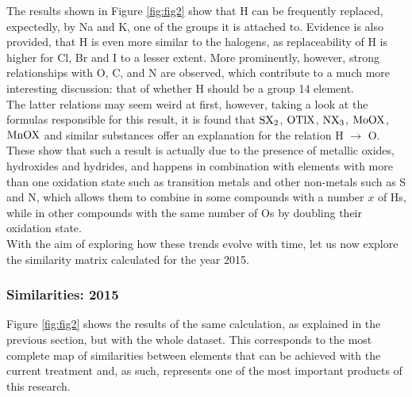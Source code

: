 \documentclass[article]{article}
\begin{document}
The results shown in Figure \ref{fig:fig2} show that H can be frequently replaced, expectedly, by Na and K, one of the groups it is attached to. Evidence is also provided, that H is even more similar to the halogens, as replaceability of H is higher for Cl, Br and I to a lesser extent. More prominently, however, strong relationships with O, C, and N are observed, which contribute to a much more interesting discussion: that of whether H should be a group 14 element.\\

The latter relations may seem weird at first, however, taking a look at the formulas responsible for this result, it is found that $\ce{SX2}$, $\ce{OTlX}$, $\ce{NX3}$, $\ce{MoOX}$, $\ce{MnOX}$ and similar substances offer an explanation for the relation H $\rightarrow$ O. These show that such a result is actually due to the presence of metallic oxides, hydroxides and hydrides, and happens in combination with elements with more than one oxidation state such as transition metals and other non-metals such as S and N, which allows them to combine in some compounds with a number $\textit{x}$ of Hs, while in other compounds with the same number of Os by doubling their oxidation state.\\

With the aim of exploring how these trends evolve with time, let us now explore the similarity matrix calculated for the year 2015.

\subsubsection{Similarities: 2015}

Figure \ref{fig:fig2} shows the results of the same calculation, as explained in the previous section, but with the whole dataset. This corresponds to the most complete map of similarities between elements that can be achieved with the current treatment and, as such, represents one of the most important products of this research. \\
\end{document}
